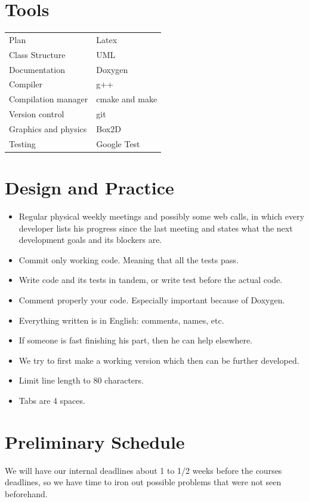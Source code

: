 \documentclass{article}
\begin{document}
\section{Tools}
\begin{tabular}{ll}
Plan                    & Latex \\
Class Structure         & UML \\
Documentation           & Doxygen \\
Compiler                & g++ \\
Compilation manager     & cmake and make \\
Version control         & git \\
Graphics and physics    & Box2D \\
Testing                 & Google Test \\
\end{tabular}



\section{Design and Practice}
\begin{itemize}
\item Regular physical weekly meetings and possibly some web calls,
in which every developer lists his progress since the last meeting
and states what the next development goals and its blockers are.
\item Commit only working code. Meaning that all the tests pass.
\item Write code and its tests in tandem, or write test before the actual code.
\item Comment properly your code. Especially important because of Doxygen.
\item Everything written is in English: comments, names, etc.
\item If someone is fast finishing his part, then he can help elsewhere.
\item We try to first make a working version which then can be further
developed.
\item Limit line length to 80 characters.
\item Tabs are 4 spaces.
\end{itemize}



\section{Preliminary Schedule}
We will have our internal deadlines about 1 to 1/2 weeks before the
courses deadlines, so we have time to iron out possible problems that
were not seen beforehand.
\end{document}
